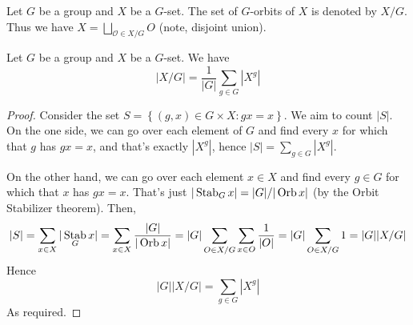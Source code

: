 \begin{definition}
  Let $G$ be a group and $X$ be a $G$-set. The set of $G$-orbits of $X$ is denoted by
  $X/G$. Thus we have $X=\bigsqcup_{\mathcal{O}\in X/G} O$ (note, disjoint union).
\end{definition}

\begin{theorem}
  Let $G$ be a group and $X$ be a $G$-set. We have 
  \[|X/G|=\frac{1}{|G|}\sum_{g\in G} |X^g|\]
  \label{thm:notBurnside}
\end{theorem}
\begin{proof}
  Consider the set $S=\left\{ (g,x)\in G\times X : gx=x \right\}$. We aim to count $|S|$.
  On the one side, we can go over each element of $G$ and find every $x$ for which that
  $g$ has $gx=x$, and that's exactly $|X^g|$, hence $|S|=\sum_{g\in G} |X^g|$.

  On the other hand, we can go over each element $x\in X$ and find every $g\in G$ for which
  that $x$ has $gx=x$. That's just $|\operatorname*{Stab}_G x|= |G|/|\operatorname*{Orb} x|$ (by the Orbit Stabilizer
  theorem). Then, 
  \[|S|= \sum_{x\in X} |\operatorname*{Stab}_G x|= \sum_{x\in X} \frac{|G|}{|\operatorname*{Orb} x|}= |G|
  \sum_{O\in X/G} \sum_{x\in O} \frac{1}{|O|}= |G|\sum_{O\in X/G} 1 = |G||X/G|\]
  Hence
  \[|G||X/G| = \sum_{g\in G} |X^g|\]
  As required.
\end{proof}

